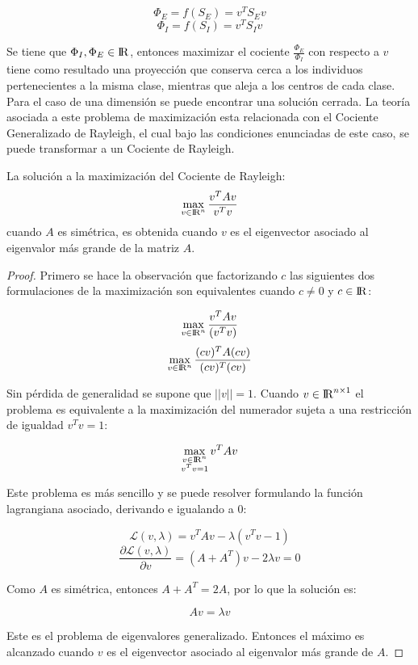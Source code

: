  $$\Phi_{E} = f(S_E) = v^T S_E v$$
 $$\Phi_{I} = f(S_I) = v^T S_I v$$

Se tiene que $\Phi_{I}, \Phi_{E} \in {\rm I\!R}$, entonces maximizar el cociente $\frac{\Phi_{E}}{\Phi_{I}}$ con respecto a $v$ tiene como resultado una proyección que conserva cerca a los individuos pertenecientes a la misma clase, mientras que aleja a los centros de cada clase. Para el caso de una dimensión se puede encontrar una solución cerrada. La teoría asociada a este problema de maximización esta relacionada con el Cociente Generalizado de Rayleigh, el cual bajo las condiciones enunciadas de este caso, se puede transformar a un Cociente de Rayleigh. 

\begin{proposition} \label{lemma2.2}
La solución a la maximización del Cociente de Rayleigh:
$$\max_{v \in {\rm I\!R}^{n} } \frac{v^T A v}{v^Tv} $$
cuando $A$ es simétrica, es obtenida cuando $v$ es el eigenvector asociado al eigenvalor más grande de la matriz $A$.
\end{proposition}

\begin{proof}
Primero se hace la observación que factorizando $c$ las siguientes dos formulaciones de la maximización son equivalentes cuando $c \neq 0$ y $c \in {\rm I\!R}$: 

$$\max_{v \in {\rm I\!R}^{n} } \frac{v^T A v}{(v^T v)} $$
$$\max_{v \in {\rm I\!R}^{n} } \frac{(cv)^T A (cv)}{(cv)^T(cv)} $$

Sin pérdida de generalidad se supone que $||v|| = 1$. Cuando $v \in {\rm I\!R}^{n \times 1}$ el problema es equivalente a la maximización del numerador sujeta a una restricción de igualdad $v^T v = 1$:

$$\max_{\substack{v \in {\rm I\!R}^{n}\\ v^T v = 1 }} v^T A v $$

Este problema es más sencillo y se puede resolver formulando la función lagrangiana asociado, derivando e igualando a $0$:

$$\mathcal{L}(v, \lambda) = v^T A v - \lambda(v^T v -1)$$
$$\frac{\partial \mathcal{L}(v, \lambda)}{\partial v} = (A + A^T) v - 2\lambda v = 0$$

Como $A$ es simétrica, entonces $A + A^T = 2A$, por lo que la solución es:

\begin{equation}\label{eq:2.14}
A v = \lambda v  
\end{equation}


Este es el problema de eigenvalores generalizado. Entonces el máximo es alcanzado cuando $v$ es el eigenvector asociado al eigenvalor más grande de $A$.

\end{proof}


